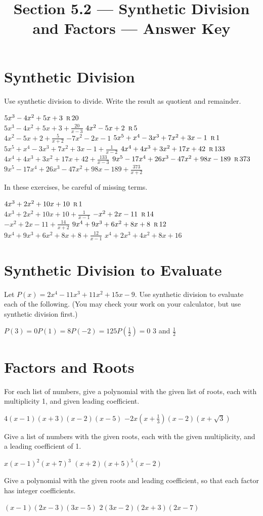 

\title{Section 5.2 --- Synthetic Division and Factors --- Answer Key}

\newcommand{\twoform}[3]{$#1 \remainder #2$\\$#1+\frac{#2}{#3}$}


\maketitle

\section*{Synthetic Division}
Use synthetic division to divide. Write the result as quotient and remainder.
\begin{smenum}
\mitemxx
{\twoform{5x^3-4x^2+5x+3}{20}{x-3}}
{\twoform{4x^2-5x+2}{5}{x+2}}
\mitemxx
{$-7x^2-2x-1$}
{\twoform{5x^5+x^4-3x^3+7x^2+3x-1}{1}{x-2}}
\mitemxx
{\twoform{4x^4+4x^3+3x^2+17x+42}{133}{x-3}}
{\twoform{9x^5-17x^4+26x^3-47x^2+98x-189}{373}{x+2}}
\end{smenum}
In these exercises, be careful of missing terms.
\begin{smenum}
\mitemxx
{\twoform{4x^3+2x^2+10x+10}{1}{x-1}}
{\twoform{-x^2+2x-11}{14}{x+2}}
\mitemxx
{\twoform{9x^4+9x^3+6x^2+8x+8}{12}{x-1}}
{$x^4+2x^3+4x^2+8x+16$}
\end{smenum}

\section*{Synthetic Division to Evaluate}
Let $P(x)=2x^4-11x^3+11x^2+15x-9$. Use synthetic division to evaluate each of the following. (You may check your work on your calculator, but use synthetic division first.)
\begin{smenum}
\mitemxxxx
{$P(3)=0$}{$P(1)=8$}{$P(-2)=125$}{$P\left(\frac{1}{2}\right)=0$}
\mitemx
{$3$ and $\frac{1}{2}$}
\end{smenum}

\section*{Factors and Roots}
For each list of numbers, give a polynomial with the given list of roots, each with multiplicity 1, and given leading coefficient.
\begin{smenum}
\mitemxx
{$4(x-1)(x+3)(x-2)(x-5)$}
{$-2x(x+\frac{1}{3})(x-2)(x+\sqrt{3})$}
\end{smenum}
Give a list of numbers with the given roots, each with the given multiplicity, and a leading coefficient of 1.
\begin{smenum}
\mitemxx
{$x(x-1)^2(x+7)^3$}
{$(x+2)(x+5)^5(x-2)$}
\end{smenum}
Give a polynomial with the given roots and leading coefficient, so that each factor has integer coefficients.
\begin{smenum}
\mitemxx
{$(x-1)(2x-3)(3x-5)$}
{$2(3x-2)(2x+3)(2x-7)$}
\end{smenum}

